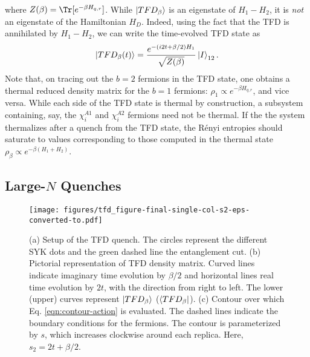 \documentclass[reprint, floatfix,eqsecnum,superscriptaddress,preprint,nofootinbib,onecolumn,amsmath,amssymb,aps,prb]{revtex4-2}
\begin{document}
where $Z(\beta) = \Tr [ e^{-\beta H_{q,r}} ]$. 
While $\ket{TFD_{\beta}}$ is an eigenstate of $H_1-H_2$, it is \emph{not} an eigenstate of the Hamiltonian $H_D$. %
Indeed, using the fact that the TFD is annihilated by $H_1-H_2$, we can write the time-evolved TFD state as
\begin{align}
	\ket{TFD_{\beta}(t)} = %
	\frac{e^{-(i2t+\beta/2)H_1}}{\sqrt{Z(\beta)}} \ket{I}_{12}.
\end{align}
Note that, on tracing out the $b=2$ fermions in the TFD state, one obtains a thermal reduced density matrix for the $b=1$ fermions: $\rho_1 \propto e^{-\beta H_{q,r}}$, and vice versa. While each side of the TFD state is thermal by construction, a subsystem containing, say, the $\chi^{A1}_i$ and $\chi^{A2}_i$ fermions need not be thermal. If the the system thermalizes after a quench from the TFD state, %
the R\'enyi entropies should saturate to values corresponding to those computed in the thermal state $\rho_{\beta} \propto e^{-\beta (H_1 + H_2)}$. 

\subsection{Large-$N$ Quenches}

\begin{figure}%
  \texttt{[image: figures/tfd\_figure-final-single-col-s2-eps-converted-to.pdf]}
  \caption{(a) Setup of the TFD quench. The circles represent the different SYK dots and the green dashed line the entanglement cut. 
  (b) Pictorial representation of TFD density matrix. Curved lines indicate imaginary time evolution by $\beta/2$ and horizontal lines real time evolution by $2t$, with the direction from right to left. %
  The lower (upper) curves represent $\ket{TFD_\beta}$ ($\bra{TFD_\beta}$). (c) Contour over which Eq. \eqref{eqn:contour-action} is evaluated. The dashed lines indicate the boundary conditions for the fermions.  %
  The contour is parameterized by $s$, which increases clockwise around each replica. %
  Here, $s_2 = 2t+\beta / 2$.}
  \label{fig:tfd-setup}
\end{figure}
\end{document}
